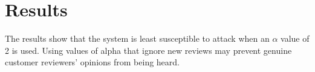 \documentclass{article}
\begin{document}
\section{Results} %
The results show that the system is least susceptible to attack when an $\alpha$ value of 2 is used.
Using values of alpha that ignore new reviews may prevent genuine customer reviewers' opinions from being heard.

\newpage
\raggedright
{}

\newpage
\end{document}
